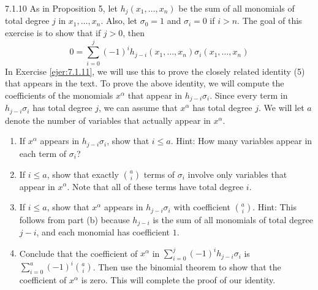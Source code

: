 \documentclass[twoside]{article}
\begin{document}
\begin{ejercicio}{7.1.10}
As in Proposition 5, let $h_j(x_1 , \dots , x_n)$ be the sum of all monomials of total degree $j$ in $x_1 ,\dots , x_n$.
Also, let $σ_0 = 1$ and $σ_i = 0$ if $i > n$.
The goal of this exercise is to show that if $j > 0$, then
\[ 0 = \sum_{i=0}^j (-1)^i h_{j-i}(x_1,\dots,x_n) \sigma_i(x_1,\dots,x_n) \]
In Exercise \ref{ejer:7.1.11}, we will use this to prove the closely related identity (5) that appears in the text.
To prove the above identity, we will compute the coefficients of the monomials $x^α$ that appear in $h_{j-i} σ_i$.
Since every term in $h_{j-i} σ_i$ has total degree $j$, we can assume that $x^α$ has total degree $j$.
We will let $a$ denote the number of variables that actually appear in $x^α$.
\begin{enumerate}
\item If $x^α$ appears in $h_{j-i} σ_i$, show that $i ≤ a$. Hint: How many variables appear in each term of $σ_i$?
\item If $i ≤ a$, show that exactly $\binom{a}{i}$ terms of $σ_i$ involve only variables that appear in $x^α$.
Note that all of these terms have total degree $i$.
\item If $i ≤ a$, show that $x^α$ appears in $h_{j-i} σ_i$ with coefficient $\binom{a}{i}$.
Hint: This follows from part (b) because $h_{j-i}$ is the sum of all monomials of total degree $j - i$, and each monomial has coefficient $1$.
\item Conclude that the coefficient of $x^α$ in $\sum_{i=0}^j (-1)^i h_{j-i}σ_i$ is $\sum_{i=0}^a (-1)^i \binom{a}{i}$.
Then use the binomial theorem to show that the coefficient of $x^α$ is zero.
This will complete the proof of our identity.
\end{enumerate}
\end{ejercicio}
\end{document}

